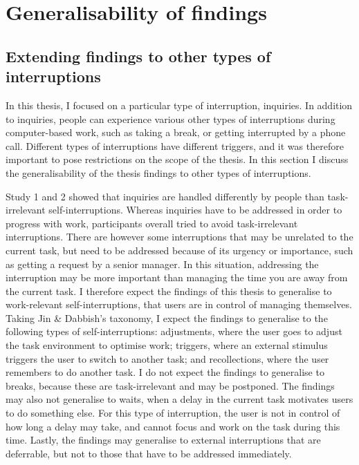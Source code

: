\section{Generalisability of findings}

\subsection{Extending findings to other types of interruptions}
In this thesis, I focused on a particular type of interruption, inquiries. In addition to inquiries, people can experience various other types of interruptions during computer-based work, such as taking a break, or getting interrupted by a phone call. Different types of interruptions have different triggers, and it was therefore important to pose restrictions on the scope of the thesis. In this section I discuss the generalisability of the thesis findings to other types of interruptions. 

Study 1 and 2 showed that inquiries are handled differently by people than task-irrelevant self-interruptions. Whereas inquiries have to be addressed in order to progress with work, participants overall tried to avoid task-irrelevant interruptions. There are however some interruptions that may be unrelated to the current task, but need to be addressed because of its urgency or importance, such as getting a request by a senior manager. In this situation, addressing the interruption may be more important than managing the time you are away from the current task. I therefore expect the findings of this thesis to generalise to work-relevant self-interruptions, that users are in control of managing themselves. Taking Jin \& Dabbish’s taxonomy, I expect the findings to generalise to the following types of self-interruptions: adjustments, where the user goes to adjust the task environment to optimise work; triggers, where an external stimulus triggers the user to switch to another task; and recollections, where the user remembers to do another task. 
I do not expect the findings to generalise to breaks, because these are task-irrelevant and may be postponed. The findings may also not generalise to waits, when a delay in the current task motivates users to do something else. For this type of interruption, the user is not in control of how long a delay may take, and cannot focus and work on the task during this time. Lastly, the findings may generalise to external interruptions that are deferrable, but not to those that have to be addressed immediately. 

